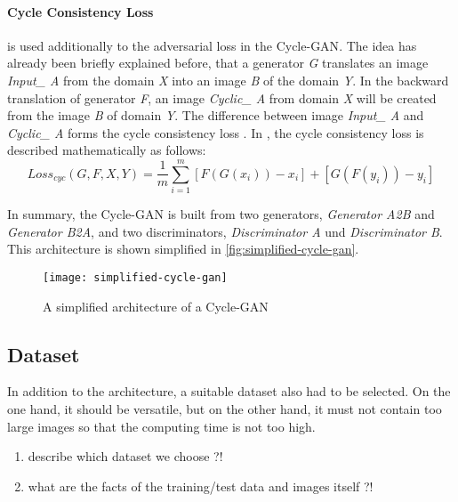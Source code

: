 \documentclass[fleqn,10pt]{SelfArx} %
\begin{document}
\paragraph{Cycle Consistency Loss} is used additionally to the adversarial loss in the Cycle-\ac{GAN}. The idea has already been briefly explained before, that a generator \textit{G} translates an image \textit{Input\_ A} from the domain \textit{X} into an image \textit{B} of the domain \textit{Y}. In the backward translation of generator \textit{F}, an image \textit{Cyclic\_ A} from domain \textit{X} will be created from the image \textit{B} of domain \textit{Y}. The difference between image \textit{Input\_ A} and \textit{Cyclic\_ A} forms the cycle consistency loss \cite{Introduction-to-Cycle-GANs}. In \cite{Introduction-to-Cycle-GANs}, the cycle consistency loss is described mathematically as follows:
\begin{equation*}
	Loss_{cyc}(G,F,X,Y) = \frac{1}{m} \sum^{m}_{i=1}[F(G(x_i))-x_i]+[G(F(y_i))-y_i]
\end{equation*}

In summary, the Cycle-\ac{GAN} is built from two generators, \textit{Generator A2B} and \textit{Generator B2A}, and two discriminators, \textit{Discriminator A} und \textit{Discriminator B}. This architecture is shown simplified in \autoref{fig:simplified-cycle-gan}.

\begin{figure}[htb] 
	\centering 
	\texttt{[image: simplified-cycle-gan]}
	\caption{A simplified architecture of a Cycle-\ac{GAN} \cite{Introduction-to-Cycle-GANs}}
	\label{fig:simplified-cycle-gan}
\end{figure}


\subsection{Dataset}
In addition to the architecture, a suitable dataset also had to be selected. On the one hand, it should be versatile, but on the other hand, it must not contain too large images so that the computing time is not too high.
\begin{enumerate}[noitemsep] %
	\item describe which dataset we choose ?!
	\item what are the facts of the training/test data and images itself ?!
\end{enumerate} 
\end{document}
